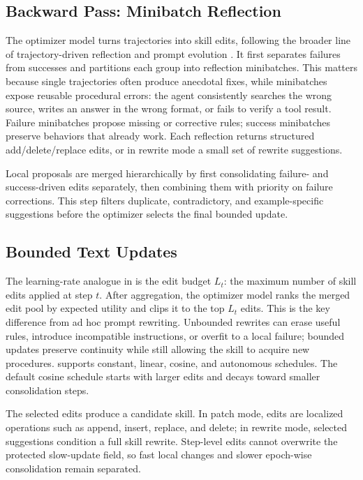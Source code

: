 \subsection{Backward Pass: Minibatch Reflection}
\label{sec:method_backward}

The optimizer model turns trajectories into skill edits, following the broader line of trajectory-driven reflection and prompt evolution \citep{shinn2023reflexion,madaan2023selfrefine,agrawal2025gepa}. It first separates failures from successes and partitions each group into reflection minibatches. This matters because single trajectories often produce anecdotal fixes, while minibatches expose reusable procedural errors: the agent consistently searches the wrong source, writes an answer in the wrong format, or fails to verify a tool result. Failure minibatches propose missing or corrective rules; success minibatches preserve behaviors that already work. Each reflection returns structured add/delete/replace edits, or in rewrite mode a small set of rewrite suggestions.

Local proposals are merged hierarchically by first consolidating failure- and success-driven edits separately, then combining them with priority on failure corrections. This step filters duplicate, contradictory, and example-specific suggestions before the optimizer selects the final bounded update.

\subsection{Bounded Text Updates}
\label{sec:method_controls}

The learning-rate analogue in \ourmethod{} is the edit budget $L_t$: the maximum number of skill edits applied at step $t$. After aggregation, the optimizer model ranks the merged edit pool by expected utility and clips it to the top $L_t$ edits. This is the key difference from ad hoc prompt rewriting. Unbounded rewrites can erase useful rules, introduce incompatible instructions, or overfit to a local failure; bounded updates preserve continuity while still allowing the skill to acquire new procedures. \ourmethod{} supports constant, linear, cosine, and autonomous schedules. The default cosine schedule starts with larger edits and decays toward smaller consolidation steps.

The selected edits produce a candidate skill. In patch mode, edits are localized operations such as append, insert, replace, and delete; in rewrite mode, selected suggestions condition a full skill rewrite. Step-level edits cannot overwrite the protected slow-update field, so fast local changes and slower epoch-wise consolidation remain separated.



